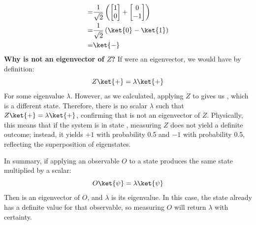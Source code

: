 \begin{enumerate}
\begin{remarkbox}
\begin{itemize}
\begin{align*}
                =&
                \frac{1}{\sqrt{2}}\left(
                    \begin{bmatrix}
                        1 \\
                        0
                    \end{bmatrix}
                    +
                    \begin{bmatrix}
                        0 \\
                        -1
                    \end{bmatrix}
                \right) \\
                =&
                \frac{1}{\sqrt{2}}\left(
                    \ket{0} - \ket{1}
                \right) \\
                =&
                \ket{-}
            \end{align*}
            \textcolor{Green3}{ \textbf{Why is \ket{+} not an eigenvector of $Z$?}} If \ket{+} were an eigenvector, we would have by definition:
            \begin{equation*}
                Z\ket{+} = \lambda \ket{+}
            \end{equation*}
            For some eigenvalue $\lambda$. However, as we calculated, applying $Z$ to \ket{+} gives us \ket{-}, which is a different state. Therefore, there is no scalar $\lambda$ such that $Z\ket{+} = \lambda \ket{+}$, confirming that \ket{+} is not an eigenvector of $Z$. Physically, this means that if the system is in state \ket{+}, measuring $Z$ does not yield a definite outcome; instead, it yields $+1$ with probability 0.5 and $-1$ with probability 0.5, reflecting the superposition of eigenstates.
        \end{itemize}
        In summary, if applying an observable $O$ to a state \ket{\psi} produces the same state multiplied by a scalar:
        \begin{equation*}
            O\ket{\psi} = \lambda \ket{\psi}
        \end{equation*}
        Then \ket{\psi} is an eigenvector of $O$, and $\lambda$ is its eigenvalue. In this case, the state already has a definite value for that observable, so measuring $O$ will return $\lambda$ with certainty.


\end{remarkbox}
\end{enumerate}
